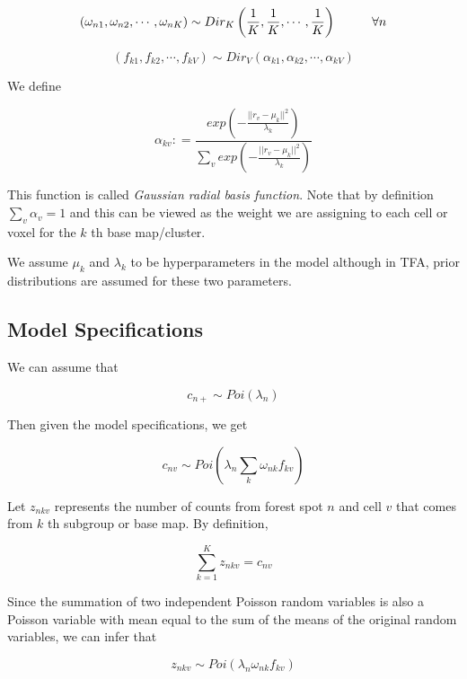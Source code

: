 \documentclass[]{article}
\begin{document}
\[ (\omega_{n1}, \omega_{n2}, \cdots, \omega_{nK}) \sim  Dir_{K} \left ( \frac{1}{K}, \frac{1}{K}, \cdots, \frac{1}{K} \right) \hspace{1 cm} \forall n\]

\[ (f_{k1}, f_{k2}, \cdots, f_{kV}) \sim Dir_{V} \left ( \alpha_{k1}, \alpha_{k2}, \cdots, \alpha_{kV} \right ) \]

We define

\begin{equation}
 \alpha_{kv} : = \frac{exp(- \frac{|| r_{v} - \mu_{k} ||^2}{\lambda_{k}})}{\sum_{v} exp(- \frac{|| r_{v} - \mu_{k} ||^2}{\lambda_{k}})} 
 \label{lab:alpha}
 \end{equation}

This function is called \emph{Gaussian radial basis function}. Note that
by definition \(\sum_{v} \alpha_{v}=1\) and this can be viewed as the
weight we are assigning to each cell or voxel for the \(k\) th base
map/cluster.

We assume \(\mu_{k}\) and \(\lambda_{k}\) to be hyperparameters in the
model although in TFA, prior distributions are assumed for these two
parameters.

\subsection{Model Specifications}\label{model-specifications}

We can assume that

\begin{equation}
c_{n+} \sim Poi(\lambda_{n}) 
\label{lab:libsize}
\end{equation}

Then given the model specifications, we get

\begin{equation}
c_{nv} \sim Poi \left ( \lambda_{n} \sum_{k} \omega_{nk} f_{kv} \right)
\end{equation}

Let \(z_{nkv}\) represents the number of counts from forest spot \(n\)
and cell \(v\) that comes from \(k\) th subgroup or base map. By
definition,

\[ \sum_{k=1}^{K} z_{nkv} = c_{nv}  \]

Since the summation of two independent Poisson random variables is also
a Poisson variable with mean equal to the sum of the means of the
original random variables, we can infer that

\[ z_{nkv} \sim Poi \left (\lambda_{n}\omega_{nk} f_{kv} \right ) \]
\end{document}
